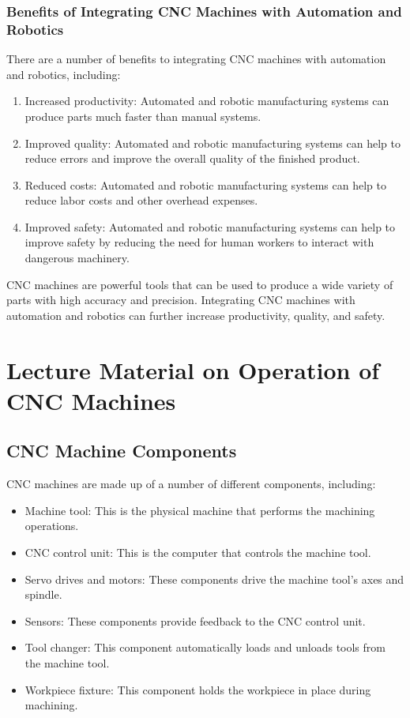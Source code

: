 \documentclass{article}
\begin{document}
\subsubsection{Benefits of Integrating CNC Machines with Automation and Robotics}
There are a number of benefits to integrating CNC machines with automation and robotics, including:
\begin{enumerate}
    \item Increased productivity: Automated and robotic manufacturing systems can produce parts much faster than manual systems.
    \item Improved quality: Automated and robotic manufacturing systems can help to reduce errors and improve the overall quality of the finished product.
    \item Reduced costs: Automated and robotic manufacturing systems can help to reduce labor costs and other overhead expenses.
    \item Improved safety: Automated and robotic manufacturing systems can help to improve safety by reducing the need for human workers to interact with dangerous machinery.
\end{enumerate}

CNC machines are powerful tools that can be used to produce a wide variety of parts with high accuracy and precision. Integrating CNC machines with automation and robotics can further increase productivity, quality, and safety.

\newpage

\section{Lecture Material on Operation of CNC Machines}
\subsection{CNC Machine Components}
CNC machines are made up of a number of different components, including:
\begin{itemize}
    \item Machine tool: This is the physical machine that performs the machining operations.
    \item CNC control unit: This is the computer that controls the machine tool.
    \item Servo drives and motors: These components drive the machine tool's axes and spindle.
    \item Sensors: These components provide feedback to the CNC control unit.
    \item Tool changer: This component automatically loads and unloads tools from the machine tool.
    \item Workpiece fixture: This component holds the workpiece in place during machining.
\end{itemize}
\end{document}
